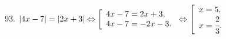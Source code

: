 93. $|4x-7|=|2x+3|\Leftrightarrow \left[\begin{array}{l} 4x-7=2x+3,\\ 4x-7=-2x-3.\end{array}\right.
\Leftrightarrow \left[\begin{array}{l} x=5,\\ x=\cfrac{2}{3}.\end{array}\right.$\\

